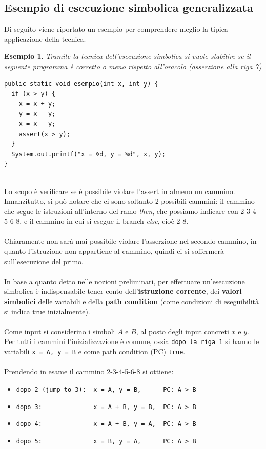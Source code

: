 \documentclass[a4paper, 12pt, oneside]{book}
\theoremstyle{normal}
\newtheorem{esempio}{Esempio}
\begin{document}
\subsection{Esempio di esecuzione simbolica generalizzata}
Di seguito viene riportato un esempio per comprendere meglio la tipica applicazione della tecnica.
\begin{esempio}
\textit{Tramite la tecnica dell'esecuzione simbolica si vuole stabilire se il seguente programma è corretto o meno rispetto all'oracolo (asserzione alla riga 7)}
\begin{lstlisting}
public static void esempio(int x, int y) {
  if (x > y) {
    x = x + y;
    y = x - y;
    x = x - y;
    assert(x > y);
  }
  System.out.printf("x = %d, y = %d", x, y);
}
\end{lstlisting}
\end{esempio}
\noindent \\ Lo scopo è verificare se è possibile violare l'assert in almeno un cammino. 
\\ Innanzitutto, si può notare che ci sono soltanto 2 possibili cammini: il cammino che segue le istruzioni all'interno del ramo \textit{then}, che possiamo indicare con 2-3-4-5-6-8, e il cammino in cui si esegue il branch \textit{else}, cioè 2-8.
\\ \\ Chiaramente non sarà mai possibile violare l'asserzione nel secondo cammino, in quanto l'istruzione non appartiene al cammino, quindi ci si soffermerà sull'esecuzione del primo.
\\ \\ In base a quanto detto nelle nozioni preliminari, per effettuare un'esecuzione simbolica è indispensabile tener conto dell'\textbf{istruzione corrente}, dei \textbf{valori simbolici} delle variabili e della \textbf{path condition} (come condizioni di eseguibilità si indica true inizialmente).
\\ \\ Come input si considerino i simboli $A$ e $B$, al posto degli input concreti $x$ e $y$.
\\ Per tutti i cammini l'inizializzazione è comune, ossia \verb|dopo la riga 1| si hanno le variabili \verb|x = A, y = B| e come path condition (PC) \verb|true|.
\\ \\ Prendendo in esame il cammino 2-3-4-5-6-8 si ottiene:
\begin{itemize}[label={--}, itemsep=0pt, topsep=2pt]
    \item \verb|dopo 2 (jump to 3):  x = A, y = B,      PC: A > B|
    \item \verb|dopo 3:              x = A + B, y = B,  PC: A > B|
    \item \verb|dopo 4:              x = A + B, y = A,  PC: A > B|
    \item \verb|dopo 5:              x = B, y = A,      PC: A > B|
\end{itemize}
\end{document}
